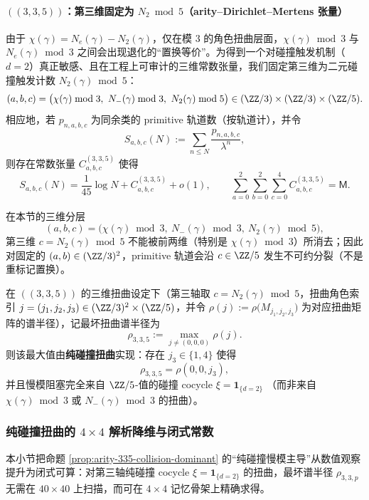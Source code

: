 \paragraph{\texorpdfstring{$((3,3,5))$}{(3,3,5)}：第三维固定为 \texorpdfstring{$N_2\bmod 5$}{N2 mod 5}（arity--Dirichlet--Mertens 张量）}
由于 $\chi(\gamma)=N_e(\gamma)-N_2(\gamma)$，仅在模 $3$ 的角色扭曲层面，$\chi(\gamma)\bmod 3$ 与 $N_e(\gamma)\bmod 3$ 之间会出现退化的“置换等价”。为得到一个对碰撞触发机制（$d=2$）真正敏感、且在工程上可审计的三维常数张量，我们固定第三维为二元碰撞触发计数
\(
N_2(\gamma)\bmod 5
\)：
$$
(a,b,c)=\bigl(\chi(\gamma)\bmod 3,\ N_-(\gamma)\bmod 3,\ N_2(\gamma)\bmod 5\bigr)\in(\ZZ/3)\times(\ZZ/3)\times(\ZZ/5).
$$
相应地，若 $p_{n,a,b,c}$ 为同余类的 primitive 轨道数（按轨道计），并令
$$
S_{a,b,c}(N):=\sum_{n\le N}\frac{p_{n,a,b,c}}{\lambda^n},
$$
则存在常数张量 $C^{(3,3,5)}_{a,b,c}$ 使得
$$
S_{a,b,c}(N)=\frac{1}{45}\log N + C^{(3,3,5)}_{a,b,c}+o(1),
\qquad
\sum_{a=0}^2\sum_{b=0}^2\sum_{c=0}^4 C^{(3,3,5)}_{a,b,c}=\mathsf{M}.
$$
\begin{remark}\label{prop:arity-335-n2-nondegenerate}
在本节的三维分层
$$
(a,b,c)=\bigl(\chi(\gamma)\bmod 3,\ N_-(\gamma)\bmod 3,\ N_2(\gamma)\bmod 5\bigr),
$$
第三维 $c=N_2(\gamma)\bmod 5$ 不能被前两维（特别是 $\chi(\gamma)\bmod 3$）所消去；因此对固定的 $(a,b)\in(\ZZ/3)^2$，primitive 轨道会沿 $c\in\ZZ/5$ 发生不可约分裂（不是重标记置换）。
\end{remark}

\begin{remark}\label{prop:arity-335-collision-dominant}
在 \(((3,3,5))\) 的三维扭曲设定下（第三轴取 $c=N_2(\gamma)\bmod 5$，扭曲角色索引 $j=(j_1,j_2,j_3)\in(\ZZ/3)^2\times(\ZZ/5)$，并令
\(
\rho(j):=\rho\bigl(M_{j_1,j_2,j_3}\bigr)
\)
为对应扭曲矩阵的谱半径），记最坏扭曲谱半径为
$$
\rho_{3,3,5}:=\max_{j\neq (0,0,0)}\rho(j).
$$
则该最大值由\textbf{纯碰撞扭曲}实现：存在 $j_3\in\{1,4\}$ 使得
$$
\rho_{3,3,5}=\rho(0,0,j_3),
$$
并且慢模阻塞完全来自 $\ZZ/5$-值的碰撞 cocycle
\(
\xi=\mathbf{1}_{\{d=2\}}
\)
（而非来自 $\chi(\gamma)\bmod 3$ 或 $N_-(\gamma)\bmod 3$ 的扭曲）。
\end{remark}

\subsubsection{纯碰撞扭曲的 \texorpdfstring{$4\times 4$}{4x4} 解析降维与闭式常数}\label{subsec:arity-335-collision-4x4}
本小节把命题 \ref{prop:arity-335-collision-dominant} 的“纯碰撞慢模主导”从数值观察提升为闭式可算：对第三轴纯碰撞 cocycle
\(
\xi=\mathbf{1}_{\{d=2\}}
\)
的扭曲，最坏谱半径 \(\rho_{3,3,p}\) 无需在 \(40\times 40\) 上扫描，而可在 \(4\times 4\) 记忆骨架上精确求得。


